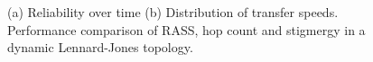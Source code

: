 \begin{figure}[htbp]
    \centering
    \caption{(a) Reliability over time (b) Distribution of transfer speeds. Performance comparison of RASS, hop count and stigmergy in a dynamic Lennard-Jones topology.}
    \label{results:dynamicTopologyLennard}
    \vspace{-2mm}
\end{figure}

